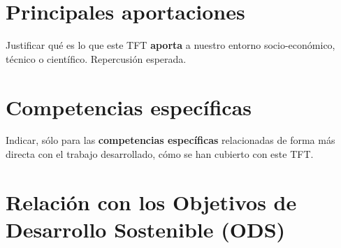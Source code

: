 \section{Principales aportaciones}

Justificar qué es lo que este TFT \textbf{aporta} a nuestro entorno socio-económico, técnico o científico. Repercusión esperada.

\section{Competencias específicas}

Indicar, sólo para las \textbf{competencias específicas} relacionadas de forma más directa con el trabajo desarrollado, cómo se han cubierto con este TFT.

\section{Relación con los Objetivos de Desarrollo Sostenible (ODS)}

